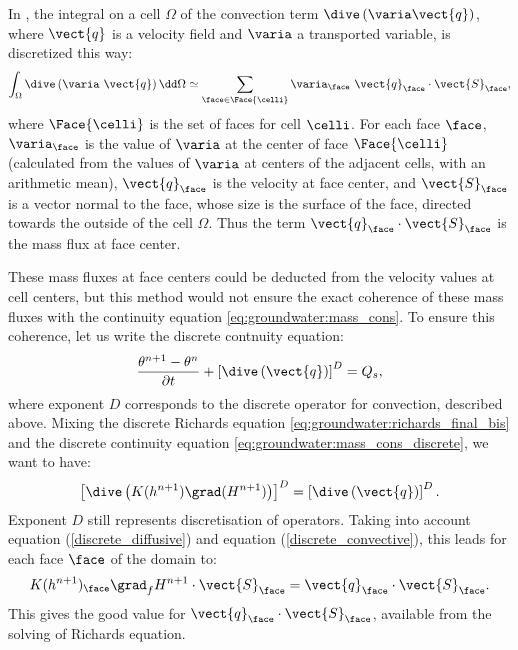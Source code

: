In \CS, the integral on a cell $\Omega$ of the convection term $\dive \left( \varia \vect{q} \right)$, where $\vect{q}$ is a velocity field
and $\varia$ a transported variable, is discretized this way:
\begin{equation}
 \label{discrete_convective}
\int_{\Omega} \dive \left( \varia \ \vect{q} \right) \dd \Omega \simeq \sum_{\face \in \Face{\celli}} \varia_\face \ \vect{q}_\face \cdot \vect{S}_\face,
\end{equation}
where $\Face{\celli}$ is the set of faces for cell $\celli$. For each face $\face$,
$\varia_\face$ is the value of $\varia$ at the center of face $\Face{\celli}$ (calculated from the values of $\varia$ at centers of the adjacent cells,
with an arithmetic mean), $\vect{q}_\face$ is the velocity at face center, and $\vect{S}_\face$ is a vector normal to the face,
whose size is the surface of the face, directed towards the outside of the cell $\Omega$.
Thus the term $\vect{q}_\face \cdot \vect{S}_\face$ is the mass flux at face center.

These mass fluxes at face centers could be deducted from the velocity values at cell centers, but this method would not ensure the exact
coherence of these mass fluxes with the continuity equation \eqref{eq:groundwater:mass_cons}.
To ensure this coherence, let us write the discrete contnuity equation:
\begin{equation}
 \label{eq:groundwater:mass_cons_discrete}
\frac{\theta^{n+1}-\theta^n}{\partial t} + \left[ \dive \left( \vect{q} \right) \right]^D = Q_s,
\end{equation}
where exponent $D$ corresponds to the discrete operator for convection, described above.
Mixing the discrete Richards equation \eqref{eq:groundwater:richards_final_bis} and the discrete continuity equation \eqref{eq:groundwater:mass_cons_discrete}, we want to have:
\begin{equation}
 \label{discrete_egality}
\left[ \dive \left( K(h^{n+1}) \grad(H^{n+1}) \right) \right]^D = \left[ \dive \left( \vect{q} \right) \right]^D.
\end{equation}
Exponent $D$ still represents discretisation of operators.
Taking into account equation (\ref{discrete_diffusive}) and equation (\ref{discrete_convective}), this leads for each face $\face$ of the domain to:
\begin{equation}
 \label{verification}
K(h^{n+1})_\face \grad_f H^{n+1}\cdot \vect{S}_\face = \vect{q}_\face \cdot \vect{S}_\face.
\end{equation}
This gives the good value for $\vect{q}_\face\cdot \vect{S}_\face$, available from the solving of Richards equation.


